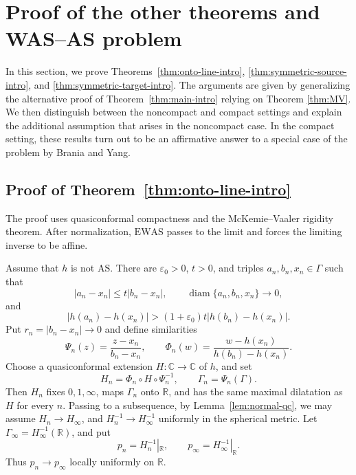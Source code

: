 \documentclass[11pt]{amsart}
\numberwithin{equation}{section}
\theoremstyle{definition} %
\theoremstyle{remarkstyle}
\newcommand{\R}{\mathbb{R}}
\newcommand{\C}{\mathbb{C}}
\newcommand{\diam}{\operatorname{diam}}
\begin{document}
\section{Proof of the other theorems and WAS--AS problem}\label{sec:proof_of_theorems_ref_thm_onto_line_intro}

In this section, we prove Theorems~\ref{thm:onto-line-intro}, \ref{thm:symmetric-source-intro}, and \ref{thm:symmetric-target-intro}.  
The arguments are given by generalizing the alternative proof of Theorem~\ref{thm:main-intro}
relying on Theorem \ref{thm:MV}.
We then distinguish between the noncompact and compact settings and explain the additional assumption that arises in the noncompact case. In the compact setting, these results turn out to be an affirmative answer to a special case of the problem by Brania and Yang.

\subsection{Proof of Theorem~\ref{thm:onto-line-intro}}

The proof uses quasiconformal compactness and the McKemie--Vaaler rigidity theorem. 
After normalization, $\mathrm{EWAS}$ passes to the limit and forces the limiting inverse to be affine.

\medskip

Assume that $h$ is not $\mathrm{AS}$. 
There are $\varepsilon_0>0$, $t>0$, and triples
$a_n,b_n,x_n\in\Gamma$ such that
\begin{equation}\label{eq:onto-failure-scale}
 |a_n-x_n|\leq t|b_n-x_n|, \qquad \diam\{a_n,b_n,x_n\}\to 0,
\end{equation}
and
\begin{equation}\label{eq:onto-failure-image}
 |h(a_n)-h(x_n)|>(1+\varepsilon_0)t|h(b_n)-h(x_n)|.
\end{equation}
Put $r_n=|b_n-x_n|\to0$ and define similarities
\[
 \Psi_n(z)=\frac{z-x_n}{b_n-x_n},
 \qquad
 \Phi_n(w)=\frac{w-h(x_n)}{h(b_n)-h(x_n)}.
\]
Choose a quasiconformal extension $H\colon\C\to\C$ of $h$, and set
\[
 H_n=\Phi_n\circ H\circ \Psi_n^{-1},\qquad\Gamma_n=\Psi_n(\Gamma).
\]
Then $H_n$ fixes $0,1,\infty$, maps $\Gamma_n$ onto $\R$, and has the same maximal dilatation as $H$ for every $n$. 
Passing to a subsequence, by Lemma~\ref{lem:normal-qc}, we may assume $H_n\to H_\infty$, and $H_n^{-1}\to H_\infty^{-1}$ 
uniformly in the spherical metric. 
Let $\Gamma_\infty=H_\infty^{-1}(\R)$, and put
\[
 p_n=H_n^{-1}|_{\R},\qquad  p_\infty=H_\infty^{-1}|_{\R}.
\]
Thus $p_n\to p_\infty$ locally uniformly on $\R$.
\end{document}
